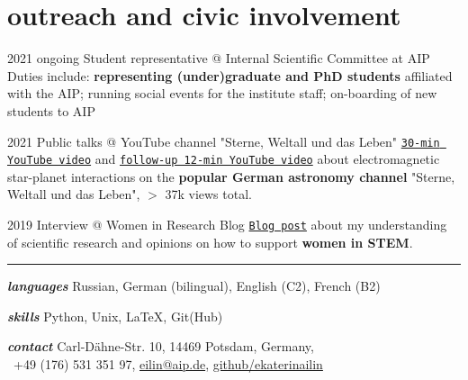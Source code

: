 \documentclass[9.5pt]{k-cv} %
\begin{document}
\section{outreach and civic involvement}
\begin{entrylist}
\entry
{2021 \to ongoing}
{Student representative @ Internal Scientific Committee at AIP}
{}
{Duties include: \textbf{representing (under)graduate and PhD students} affiliated with the AIP; running social events for the institute staff; on-boarding of new students to AIP}

\entry
{2021}
{Public talks @ YouTube channel "Sterne, Weltall und das Leben"}
{}
{\texttt{\href{https://www.youtube.com/watch?v=LLHLobUifeY}{30-min YouTube video}} and \texttt{\href{https://www.youtube.com/watch?v=YRw_tIpspRw}{follow-up 12-min YouTube video}} about electromagnetic star-planet interactions on the \textbf{popular German astronomy channel} "Sterne, Weltall und das Leben", $>$ 37k views total.}

\entry
{2019}
{Interview @ Women in Research Blog}
{}
{\texttt{\href{https://womeninresearchblog.wordpress.com/2019/06/26/ekaterina-germany/}{Blog post}} about my understanding of scientific research and opinions on how to support \textbf{women in STEM}.}


\end{entrylist}

\textcolor{red}{ \rule{19cm}{1pt} }
 
\begin{entrylist}

\entry
{\Large{\textit{\textbf{languages}}}}
{Russian, German (bilingual), English (C2), French (B2)}
{}{}

\entry
{\Large{\textit{\textbf{skills}}}}
{Python, Unix, LaTeX, Git(Hub)}
{}{}

\entry
{\Large{\textit{\textbf{contact}}}}
{Carl-D\"ahne-Str. 10, 14469 Potsdam, Germany,\\~+49 (176) 531 351 97, \href{mailto:eilin@aip.de}{eilin@aip.de}, \href{https://github.com/ekaterinailin}{github/ekaterinailin}}
{}{}
\end{entrylist}
\end{document}
